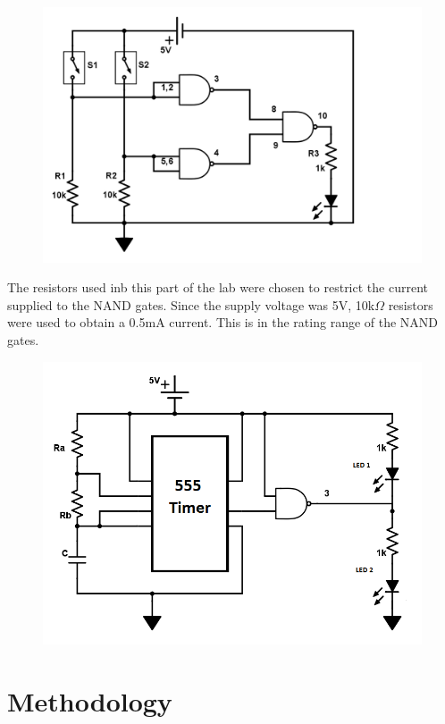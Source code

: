 \documentclass[twocolumn, amsmath]{revtex4}
\begin{document}
\begin{figure}[h]
    \includegraphics[scale=0.3]{NAND.png}  
    \caption{}
\end{figure}


The resistors used inb this part of the lab were chosen to restrict the current supplied to the NAND gates. Since the supply voltage was 5V, 10k$\Omega$ resistors were used to obtain a 0.5mA current. This is in the rating range of the NAND gates. %




\begin{figure}[h]
    \includegraphics[scale=0.3]{555.png}  
    \caption{}
\end{figure}

\section{Methodology}
\end{document}
